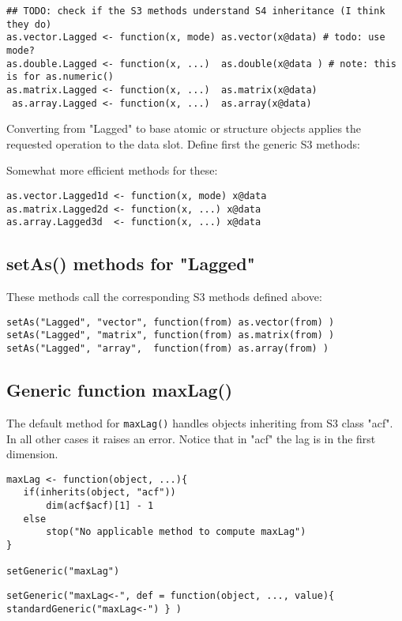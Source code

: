 \documentclass[11pt,a4paper]{article}
\begin{document}
\begin{verbatim}
## TODO: check if the S3 methods understand S4 inheritance (I think they do)
as.vector.Lagged <- function(x, mode) as.vector(x@data) # todo: use mode?
as.double.Lagged <- function(x, ...)  as.double(x@data ) # note: this is for as.numeric()
as.matrix.Lagged <- function(x, ...)  as.matrix(x@data)
 as.array.Lagged <- function(x, ...)  as.array(x@data)
\end{verbatim}
Converting from "Lagged" to base atomic or structure objects applies the requested
operation to the data slot. Define first the generic S3 methods:

Somewhat more efficient methods for these:
\begin{verbatim}
as.vector.Lagged1d <- function(x, mode) x@data
as.matrix.Lagged2d <- function(x, ...) x@data
as.array.Lagged3d  <- function(x, ...) x@data
\end{verbatim}


\subsection{setAs() methods for "Lagged"}
\label{sec:org5b4aa19}

These methods call the corresponding S3 methods defined above:
\begin{verbatim}
setAs("Lagged", "vector", function(from) as.vector(from) )
setAs("Lagged", "matrix", function(from) as.matrix(from) )
setAs("Lagged", "array",  function(from) as.array(from) )
\end{verbatim}



\subsection{Generic function maxLag()}
\label{sec:orgc12a672}

The default method for \texttt{maxLag()} handles objects inheriting from S3 class "acf". In all
other cases it raises an error. Notice that in "acf" the lag is in the first dimension.
\begin{verbatim}
maxLag <- function(object, ...){
   if(inherits(object, "acf"))
       dim(acf$acf)[1] - 1
   else
       stop("No applicable method to compute maxLag")
}

setGeneric("maxLag")
\end{verbatim}

\begin{verbatim}
setGeneric("maxLag<-", def = function(object, ..., value){ standardGeneric("maxLag<-") } )
\end{verbatim}
\end{document}

